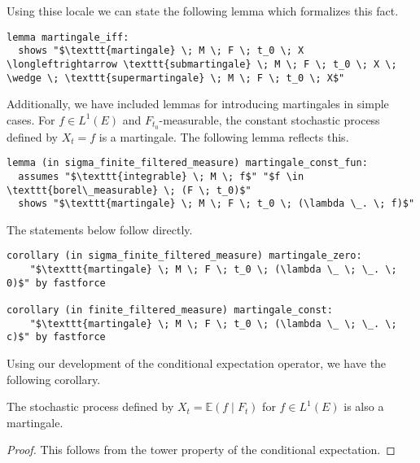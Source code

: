 Using thise locale we can state the following lemma which formalizes this fact.

\begin{isalemma}
{\small
\begin{lstlisting}[style=isabelle]
lemma martingale_iff: 
  shows "$\texttt{martingale} \; M \; F \; t_0 \; X \longleftrightarrow \texttt{submartingale} \; M \; F \; t_0 \; X \; \wedge \; \texttt{supermartingale} \; M \; F \; t_0 \; X$"
\end{lstlisting}
}
\end{isalemma}

Additionally, we have included lemmas for introducing martingales in simple cases. For $f \in L^1(E)$ and $F_{t_0}$-measurable, the constant stochastic process defined by $X_t = f$ is a martingale. The following lemma reflects this.

\begin{isalemma}
{\small
\begin{lstlisting}[style=isabelle]
lemma (in sigma_finite_filtered_measure) martingale_const_fun:  
  assumes "$\texttt{integrable} \; M \; f$" "$f \in \texttt{borel\_measurable} \; (F \; t_0)$"
  shows "$\texttt{martingale} \; M \; F \; t_0 \; (\lambda \_. \; f)$"
\end{lstlisting}
}
\end{isalemma}

The statements below follow directly.

\begin{isacorollary}
{\small
\begin{lstlisting}[style=isabelle]
corollary (in sigma_finite_filtered_measure) martingale_zero: 
	"$\texttt{martingale} \; M \; F \; t_0 \; (\lambda \_ \; \_. \; 0)$" by fastforce

corollary (in finite_filtered_measure) martingale_const: 
	"$\texttt{martingale} \; M \; F \; t_0 \; (\lambda \_ \; \_. \; c)$" by fastforce
\end{lstlisting}
}
\end{isacorollary}

Using our development of the conditional expectation operator, we have the following corollary.

\begin{corollary}
	The stochastic process defined by $X_t = \mathbb{E}(f \;\vert\; F_t)$ for $f \in L^1(E)$ is also a martingale. 
\end{corollary}
\begin{proof}
	This follows from the tower property of the conditional expectation.
\end{proof}

